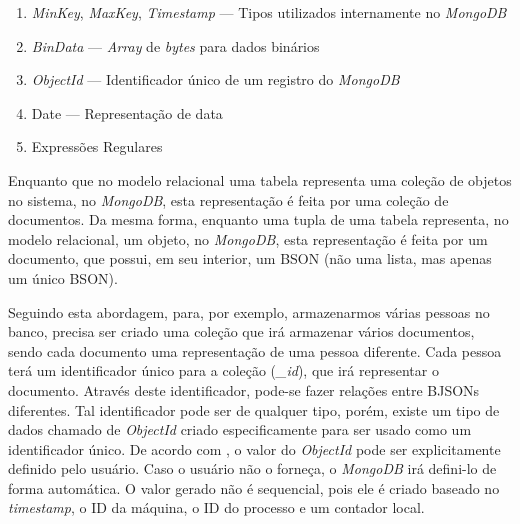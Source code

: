 \begin{enumerate}
    \item \textit{MinKey}, \textit{MaxKey}, \textit{Timestamp} --- Tipos utilizados internamente no \textit{MongoDB}

    \item \textit{BinData} --- \textit{Array} de \textit{bytes} para dados binários

    \item \textit{ObjectId} --- Identificador único de um registro do \textit{MongoDB}

    \item Date --- Representação de data
    
    \item Expressões Regulares
\end{enumerate}

Enquanto que no modelo relacional uma tabela representa uma coleção de objetos no sistema, no \textit{MongoDB}, esta representação é feita por uma coleção de documentos. Da mesma forma, enquanto uma tupla de uma tabela representa, no modelo relacional, um objeto, no \textit{MongoDB}, esta representação é feita por um documento, que possui, em seu interior, um BSON (não uma lista, mas apenas um único BSON).
    
Seguindo esta abordagem, para, por exemplo, armazenarmos várias pessoas no banco, precisa ser criado uma coleção que irá armazenar vários documentos, sendo cada documento uma representação de uma pessoa diferente. Cada pessoa terá um identificador único para a coleção (\textit{\_id}), que irá  representar o documento. Através deste identificador, pode-se fazer relações entre BJSONs diferentes. Tal identificador pode ser de qualquer tipo, porém, existe um tipo de dados chamado de \textit{ObjectId} criado especificamente para ser usado como um identificador único. De acordo com , o valor do \textit{ObjectId} pode ser explicitamente definido pelo usuário. Caso o usuário não o forneça, o \textit{MongoDB} irá defini-lo de forma automática. O valor gerado não é sequencial, pois ele é criado baseado no \textit{timestamp}, o ID da máquina, o ID do processo e um contador local.


    
